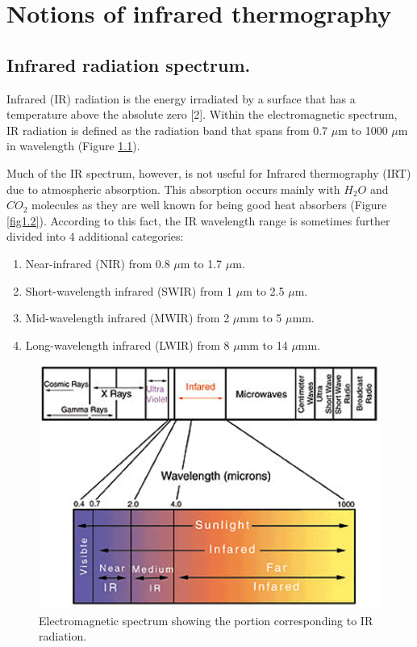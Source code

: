\pagestyle{standard}

\chapter{Notions of infrared thermography}\label{chapter1}

	\thispagestyle{chapter-first-page}
	
	\section{Infrared radiation spectrum.}\label{section1.1}
	
		Infrared (IR) radiation is the energy irradiated by a surface that has a temperature above the absolute zero [2]. Within the electromagnetic spectrum, IR radiation is defined as the radiation band that spans from 0.7 $\mu$m to 1000 $\mu$m in wavelength (Figure \ref{fig1.1}).
		
		Much of the IR spectrum, however, is not useful for Infrared thermography (IRT) due to atmospheric absorption. This absorption occurs mainly with $H_{2}O$ and $CO_{2}$ molecules as they are well known for being good heat absorbers (Figure \ref{fig1.2}). According to this fact, the IR wavelength range is sometimes further divided into 4 additional categories:

		\begin{enumerate}[label={\Roman*.}]
			\item Near-infrared (NIR) from 0.8 $\mu$m to 1.7 $\mu$m.
			\item Short-wavelength infrared (SWIR) from 1 $\mu$m to 2.5 $\mu$m.
			\item Mid-wavelength infrared (MWIR) from 2 $\mu$mm to 5 $\mu$mm.
			\item Long-wavelength infrared (LWIR) from 8 $\mu$mm to 14 $\mu$mm.
		\end{enumerate}
		
		\begin{figure}[ht!]
			\centering
			\captionsetup{justification=centering,margin=2cm}
			\includegraphics[scale=0.75]{Figures/Chapter01/lightspectrum}
			\caption{Electromagnetic spectrum showing the portion corresponding to IR radiation.}\label{fig1.1}
		\end{figure}
		
